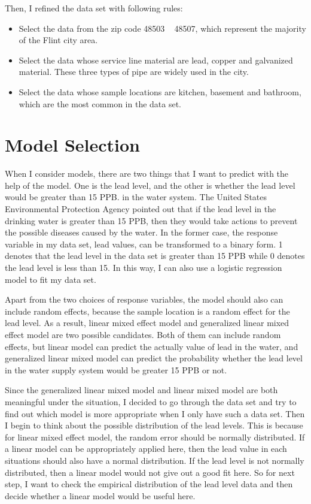 \documentclass[letterpaper,12pt]{article}
\newcommand{\sihao}{\fontsize{14pt}{\baselineskip}\selectfont}       %
\begin{document}
\noindent Then, I refined the data set with following rules:
\begin{itemize}
\item Select the data from the zip code 48503 ~ 48507, which represent the majority of the Flint city area.
\item Select the data whose service line material are lead, copper and galvanized material. These three types of pipe are widely used in the city.
\item Select the data whose sample locations are kitchen, basement and bathroom, which are the most common in the data set.
\end{itemize}

\section*{\sihao Model Selection}
When I consider models, there are two things that I want to predict with the help of the model. One is the lead level, and the other is whether the lead level would be greater than 15 PPB. in the water system. The United States Environmental Protection Agency pointed out that if the lead level in the drinking water is greater than 15 PPB, then they would take actions to prevent the possible diseases caused by the water. In the former case, the response variable in my data set, lead values, can be transformed to a binary form. 1 denotes that the lead level in the data set is greater than 15 PPB while 0 denotes the lead level is less than 15. In this way, I can also use a logistic regression model to fit my data set.

Apart from the two choices of response variables, the model should also can include random effects, because the sample location is a random effect for the lead level. As a result, linear mixed effect model and generalized linear mixed effect model are two possible candidates. Both of them can include random effects, but linear model can predict the actually value of lead in the water, and generalized linear mixed model can predict the probability whether the lead level in the water supply system would be greater 15 PPB or not.

Since the generalized linear mixed model and linear mixed model are both meaningful under the situation, I decided to go through the data set and try to find out which model is more appropriate when I only have such a data set. Then I begin to think about the possible distribution of the lead levels. This is because for linear mixed effect model, the random error should be normally distributed. If a linear model can be appropriately applied here, then the lead value in each situations should also have a normal distribution. If the lead level is not normally distributed, then a linear model would not give out a good fit here. So for next step, I want to check the empirical distribution of the lead level data and then decide whether a linear model would be useful here.
\end{document}
